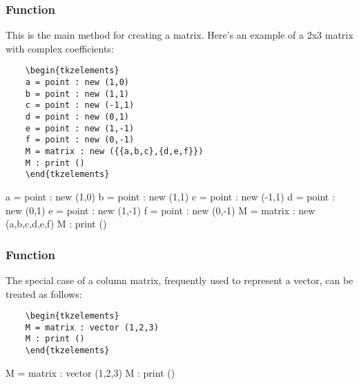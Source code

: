 \subsubsection{Function } %
\label{ssub:method_new}

This is the main method for creating a matrix. Here's an example of a 2x3 matrix with complex coefficients:

\vspace{.5em}
\begin{minipage}{.5\textwidth}
  \begin{Verbatim}
    \begin{tkzelements}
    a = point : new (1,0)
    b = point : new (1,1)
    c = point : new (-1,1)
    d = point : new (0,1)
    e = point : new (1,-1)
    f = point : new (0,-1)
    M = matrix : new ({{a,b,c},{d,e,f}})
    M : print () 
    \end{tkzelements}
  \end{Verbatim}
\end{minipage}
\begin{minipage}{.5\textwidth}
\begin{tkzelements}
a = point : new (1,0)
b = point : new (1,1)
c = point : new (-1,1)
d = point : new (0,1)
e = point : new (1,-1)
f = point : new (0,-1)
M = matrix : new ({{a,b,c},{d,e,f}})
M : print () 
\end{tkzelements}
\end{minipage}


\subsubsection{Function } %
\label{ssub:method_vector}

The special case of a column matrix, frequently used to represent a vector, can be treated as follows:

\vspace{.5em}
\begin{minipage}{.5\textwidth}
  \begin{Verbatim}
    \begin{tkzelements}
    M = matrix : vector (1,2,3)
    M : print () 
    \end{tkzelements}
  \end{Verbatim}
\end{minipage}
\begin{minipage}{.5\textwidth}
    \begin{tkzelements}
    M = matrix : vector (1,2,3)
    M : print () 
    \end{tkzelements}
\end{minipage} 

